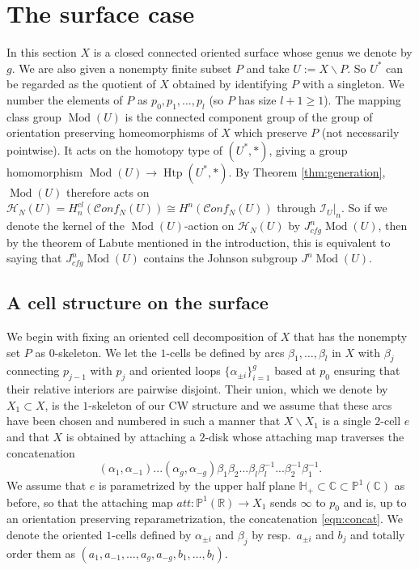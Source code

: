 \documentclass[12pt,letterpaper]{amsart}
\numberwithin{equation}{section}
\def\CC{{\mathbb C}}
\def\HH{{\mathbb H}}
\def\PP{{\mathbb P}}
\def\RR{{\mathbb R}}
\def\ssm{\smallsetminus}
\def\Hcal{{\mathcal H}}
\def\Ical{{\mathcal I}}
\newcommand\conf{\mathscr{C}\!\mathit{onf}\!}
\newcommand\cfg{\mathit{cfg}}
\newcommand\Htp{\operatorname{Htp}}
\newcommand\Mod{\operatorname{Mod}}
\theoremstyle{remark}
\begin{document}
\section{The surface case}
In this section $X$ is a closed connected  oriented surface whose genus we denote by $g$. We are also given a nonempty finite subset $P$ and take 
$U:=X\ssm P$. So $U^*$ can be regarded as the quotient of $X$ obtained by identifying  $P$ with a singleton. We number the elements of $P$ as $p_0,p_1,...,p_l$ (so $P$ has size $l+1\ge 1$). The mapping class group $\Mod(U)$ is the connected component group of the group of orientation preserving homeomorphisms  of $X$ which preserve $P$ (not necessarily pointwise). It acts on the  homotopy type  of $(U^*,*)$, giving a  group homomorphism $\Mod(U)\to \Htp(U^*,*)$. By Theorem \ref{thm:generation},  $\Mod(U)$ therefore acts on $\Hcal_N(U)=H_n^{cl}(\conf_N(U))\cong H^n(\conf_N(U))$ through $\Ical_U|_n$. So if we denote the kernel of the $\Mod(U)$-action on $\Hcal_N(U)$ by $J_\cfg^n\Mod (U)$, then 
by the theorem of Labute \cite{labute} mentioned in the introduction,  this is equivalent to saying that  $J_\cfg^n\Mod (U)$ contains the Johnson subgroup
$J^n\Mod (U)$. 



\subsection{A cell structure on the  surface}\label{sec:celldecomp of X}
We begin with fixing an oriented  cell decomposition of $X$ that has the nonempty set $P$ as $0$-skeleton.
We let the $1$-cells be defined by arcs  $\beta_1, \dots, \beta_l$ in $X$ with $\beta_j$ connecting $p_{j-1}$ with $p_j$ and oriented loops $\{\alpha_{\pm i}\}_{i=1}^g$ based at $p_0$ ensuring that their relative interiors are pairwise disjoint. Their union,  which we denote  by $X_1\subset  X$,  is the $1$-skeleton of our CW structure and we assume that  these arcs  have been chosen and numbered in such a manner that  $X\ssm X_1$ is  a single $2$-cell $e$ and that $X$ is obtained by attaching a $2$-disk whose attaching map traverses the concatenation
\begin{equation}\label{eqn:concat}
(\alpha_1,\alpha_{-1})...(\alpha_g,\alpha_{-g})\beta_1\beta_2...\beta_l\beta_l^{-1}...\beta_2^{-1}\beta_1^{-1}.
\end{equation}
We assume that $e$ is parametrized by the upper half plane $\HH_+\subset \CC\subset \PP^1(\CC)$  as before, so that the attaching  map 
$att: \PP^1(\RR) \to X_1$  sends $\infty$ to $p_0$  and is, up to an orientation preserving reparametrization,  the  concatenation \eqref{eqn:concat}.
We denote the oriented $1$-cells defined by $\alpha_{\pm i}$ and  $\beta_j$ by   resp.\  $a_{\pm i}$ and $b_j$ and totally order them as 
$(a_1, a_{-1}, \dots, a_g, a_{-g}, b_1, \dots, b_l)$.
\end{document}
